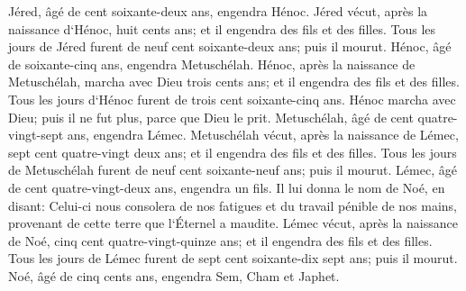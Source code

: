 \verse Jéred, âgé de cent soixante-deux ans, engendra Hénoc. 
\verse Jéred vécut, après la naissance d`Hénoc, huit cents ans; et il engendra des fils et des filles. 
\verse Tous les jours de Jéred furent de neuf cent soixante-deux ans; puis il mourut. 
\verse Hénoc, âgé de soixante-cinq ans, engendra Metuschélah. 
\verse Hénoc, après la naissance de Metuschélah, marcha avec Dieu trois cents ans; et il engendra des fils et des filles. 
\verse Tous les jours d`Hénoc furent de trois cent soixante-cinq ans. 
\verse Hénoc marcha avec Dieu; puis il ne fut plus, parce que Dieu le prit. 
\verse Metuschélah, âgé de cent quatre-vingt-sept ans, engendra Lémec. 
\verse Metuschélah vécut, après la naissance de Lémec, sept cent quatre-vingt deux ans; et il engendra des fils et des filles. 
\verse Tous les jours de Metuschélah furent de neuf cent soixante-neuf ans; puis il mourut. 
\verse Lémec, âgé de cent quatre-vingt-deux ans, engendra un fils. 
\verse Il lui donna le nom de Noé, en disant: Celui-ci nous consolera de nos fatigues et du travail pénible de nos mains, provenant de cette terre que l`Éternel a maudite. 
\verse Lémec vécut, après la naissance de Noé, cinq cent quatre-vingt-quinze ans; et il engendra des fils et des filles. 
\verse Tous les jours de Lémec furent de sept cent soixante-dix sept ans; puis il mourut. 
\verse Noé, âgé de cinq cents ans, engendra Sem, Cham et Japhet. 

\chapter{}

